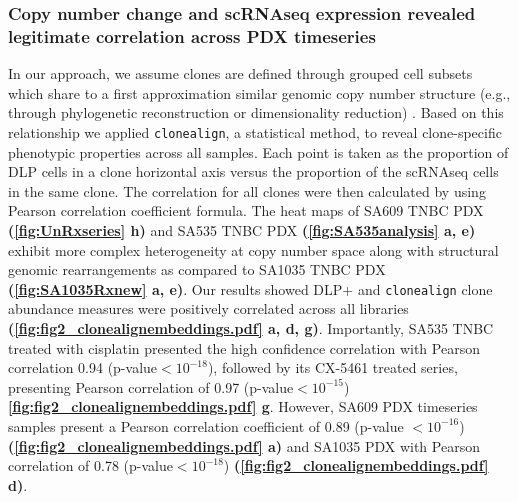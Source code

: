 \subsubsection{Copy number change and scRNAseq expression revealed legitimate correlation across PDX timeseries}
  In our approach, we assume clones are defined through grouped cell subsets which share to a first approximation similar genomic copy number structure (e.g., through phylogenetic reconstruction or dimensionality reduction) \cite{laks2019clonal}. Based on this relationship we applied
  \texttt{clonealign}, a statistical method, \cite{campbell2019clonealign} to reveal clone-specific phenotypic properties across all samples.
  Each point is taken as the proportion of DLP cells in a clone horizontal axis versus the proportion of the scRNAseq cells in the same clone. The  correlation for all clones were then calculated by using Pearson correlation coefficient formula. The heat maps of SA609 TNBC PDX \textbf{(\autoref{fig:UnRxseries} h)} and SA535 TNBC PDX \textbf{(\autoref{fig:SA535analysis} a, e)} exhibit more complex heterogeneity at copy number space along with structural genomic rearrangements as compared to SA1035 TNBC PDX \textbf{(\autoref{fig:SA1035Rxnew} a, e)}. Our results showed DLP+ and \texttt{clonealign} clone abundance measures were positively correlated across all libraries \textbf{(\autoref{fig:fig2_clonealignembeddings.pdf} a, d, g)}. Importantly, SA535 TNBC treated with cisplatin presented the high confidence correlation with Pearson correlation 0.94 (p-value$< 10^{-18}$), followed by its CX-5461 treated series, presenting Pearson correlation of 0.97 (p-value$< 10^{-15}$) \textbf{\autoref{fig:fig2_clonealignembeddings.pdf} g}. However, SA609 PDX timeseries samples present a Pearson correlation coefficient of 0.89 (p-value $< 10^{-16}$) \textbf{(\autoref{fig:fig2_clonealignembeddings.pdf} a)} and SA1035 PDX with Pearson correlation of 0.78 (p-value$< 10^{-18}$) \textbf{(\autoref{fig:fig2_clonealignembeddings.pdf} d)}.
  
  

